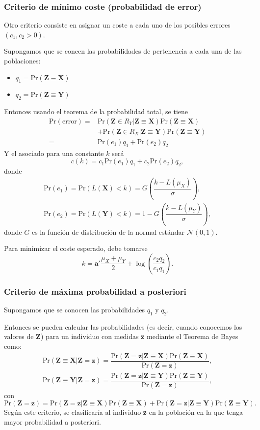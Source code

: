 \subsubsection{Criterio de mínimo coste (probabilidad de error)}
Otro criterio consiste en asignar un coste a cada uno de los posibles errores $(c_1,c_2>0)$.

Supongamos que se concen las probabilidades  de pertenencia a cada una de las poblaciones:
\begin{itemize}
\item $q_1=\mathrm{Pr}(\mathbf{Z\equiv X})$
\item $q_2=\mathrm{Pr}(\mathbf{Z\equiv Y})$
\end{itemize}
Entonces usando el teorema de la probabilidad total, se tiene 
\[ \begin{aligned}
\mathrm{Pr(error)}=&\mathrm{Pr}(\mathbf{Z}\in R_Y|\mathbf{Z\equiv X})\mathrm{Pr}(\mathbf{Z\equiv X})\\
&+\mathrm{Pr}(\mathbf{Z}\in R_X|\mathbf{Z\equiv Y})\mathrm{Pr}(\mathbf{Z\equiv Y})\\
=&\mathrm{Pr}(e_1)q_1+\mathrm{Pr}(e_2)q_2
\end{aligned} \]
Y el  asociado para una constante $k$ será \[ c(k)=c_1\mathrm{Pr}(e_1)q_1+c_2\mathrm{Pr}(e_2)q_2, \]donde \[ \begin{array}{l}
\mathrm{Pr}(e_1)=\mathrm{Pr}\left(L(\mathbf{X})<k\right)=G\left(\dfrac{k-L(\mu_X)}{\sigma}\right),\\
\mathrm{Pr}(e_2)=\mathrm{Pr}\left(L(\mathbf{Y})<k\right)=1-G\left(\dfrac{k-L(\mu_Y)}{\sigma}\right),
\end{array} \]donde $G$ es la función de distribución de la normal estándar $\mathcal{N}(0,1)$.

Para minimizar el coste esperado, debe tomarse \[ k=\mathbf{a'}\dfrac{\mu_X+\mu_Y}{2}+\log\left(\dfrac{c_2q_2}{c_1q_1}\right). \]
\subsubsection{Criterio de máxima probabilidad a posteriori}
Supongamos que se conocen las probabilidades  $q_1$ y $q_2$.

Entonces se pueden calcular las probabilidades  (es decir, cuando conocemos los valores de \textbf{Z}) para un individuo con medidas \textbf{z} mediante el Teorema de Bayes como: \[ \begin{array}{l}
\mathrm{Pr}(\mathbf{Z\equiv X|Z=z})=\dfrac{\mathrm{Pr}(\mathbf{Z=z|Z\equiv X})\mathrm{Pr}(\mathbf{Z\equiv X})}{\mathrm{Pr}(\mathbf{Z=z})},\\
\mathrm{Pr}(\mathbf{Z\equiv Y|Z=z})=\dfrac{\mathrm{Pr}(\mathbf{Z=z|Z\equiv Y})\mathrm{Pr}(\mathbf{Z\equiv Y})}{\mathrm{Pr}(\mathbf{Z=z})},
\end{array} \]con \[ \mathrm{Pr}(\mathbf{Z=z})=\mathrm{Pr}(\mathbf{Z=z|Z\equiv X})\mathrm{Pr}(\mathbf{Z\equiv X})+\mathrm{Pr}(\mathbf{Z=z|Z\equiv Y})\mathrm{Pr}(\mathbf{Z\equiv Y}). \]
Según este criterio, se clasificaría al individuo \textbf{z} en la población en la que tenga mayor probabilidad a posteriori.

